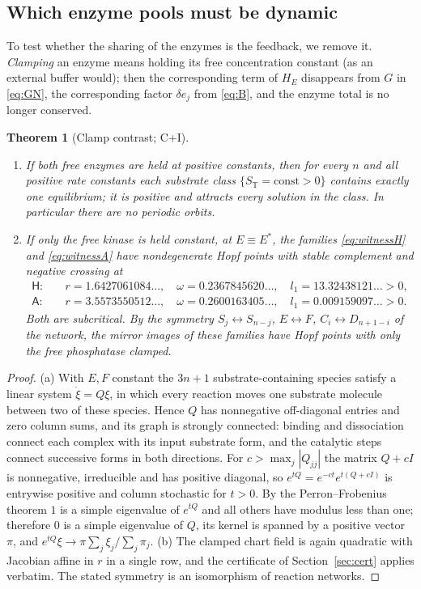 \documentclass[11pt,a4paper]{article}
\theoremstyle{plain}
\newtheorem{theorem}{Theorem}[section]
\theoremstyle{definition}
\theoremstyle{remark}
\newcommand{\ST}{S_{\mathrm T}}
\newcommand{\WA}{\mathsf A}
\newcommand{\WH}{\mathsf H}
\newcommand{\evC}{\textsf{C}}
\newcommand{\evI}{\textsf{I}}
\begin{document}
\subsection{Which enzyme pools must be dynamic}\label{sec:clamp}
To test whether the sharing of the enzymes is the feedback, we remove it. \emph{Clamping} an enzyme means holding its free concentration constant (as an external buffer would); then the corresponding term of $H_E$ disappears from $G$ in \eqref{eq:GN}, the corresponding factor $\delta e_j$ from \eqref{eq:B}, and the enzyme total is no longer conserved.

\begin{theorem}[Clamp contrast; \evC+\evI]\label{thm:clamp}
\begin{enumerate}[label=\textup{(\alph*)}]
\item If both free enzymes are held at positive constants, then for every $n$ and all positive rate constants each substrate class $\{\ST=\text{const}>0\}$ contains exactly one equilibrium; it is positive and attracts every solution in the class. In particular there are no periodic orbits.
\item If only the free kinase is held constant, at $E\equiv E^*$, the families \eqref{eq:witnessH} and \eqref{eq:witnessA} have nondegenerate Hopf points with stable complement and negative crossing at
\begin{align*}
 \WH:&\quad r=1.6427061084\ldots,\quad \omega=0.2367845620\ldots,\quad l_1=13.32438121\ldots>0,\\
 \WA:&\quad r=3.5573550512\ldots,\quad \omega=0.2600163405\ldots,\quad l_1=0.009159097\ldots>0 .
\end{align*}
Both are subcritical. By the symmetry $S_j\leftrightarrow S_{n-j}$, $E\leftrightarrow F$, $C_i\leftrightarrow D_{n+1-i}$ of the network, the mirror images of these families have Hopf points with only the free phosphatase clamped.
\end{enumerate}
\end{theorem}
\begin{proof}
(a) With $E,F$ constant the $3n+1$ substrate-containing species satisfy a linear system $\dot\xi=Q\xi$, in which every reaction moves one substrate molecule between two of these species. Hence $Q$ has nonnegative off-diagonal entries and zero column sums, and its graph is strongly connected: binding and dissociation connect each complex with its input substrate form, and the catalytic steps connect successive forms in both directions. For $c>\max_j|Q_{jj}|$ the matrix $Q+cI$ is nonnegative, irreducible and has positive diagonal, so $e^{tQ}=e^{-ct}e^{t(Q+cI)}$ is entrywise positive and column stochastic for $t>0$. By the Perron--Frobenius theorem $1$ is a simple eigenvalue of $e^{tQ}$ and all others have modulus less than one; therefore $0$ is a simple eigenvalue of $Q$, its kernel is spanned by a positive vector $\pi$, and $e^{tQ}\xi\to\pi\sum_j\xi_j/\sum_j\pi_j$.
(b) The clamped chart field is again quadratic with Jacobian affine in $r$ in a single row, and the certificate of Section~\ref{sec:cert} applies verbatim. The stated symmetry is an isomorphism of reaction networks.
\end{proof}
\end{document}
